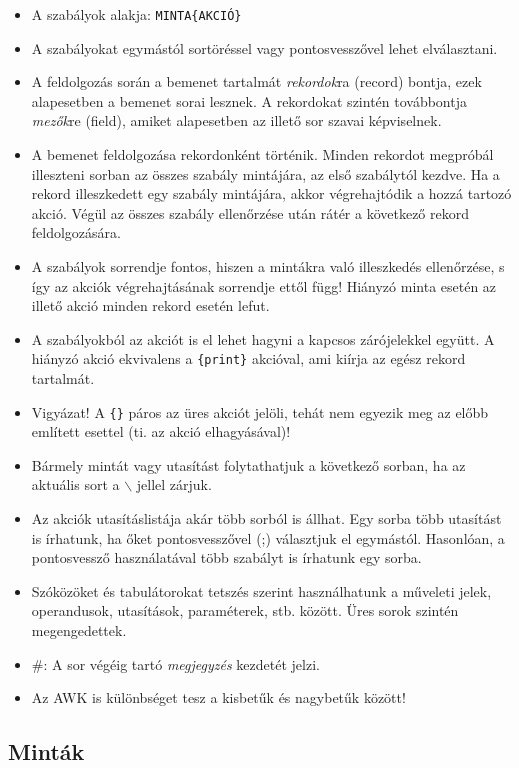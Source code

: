 \begin{itemize}
\item A szabályok alakja: \verb.MINTA{AKCIÓ}.
\item A szabályokat egymástól sortöréssel vagy pontosvesszővel lehet elválasztani.
\item A feldolgozás során a bemenet tartalmát \emph{rekordok}ra (record) bontja, ezek
alapesetben a bemenet sorai lesznek. A rekordokat szintén továbbontja \emph{mezők}re
(field), amiket alapesetben az illető sor szavai képviselnek.
\item A bemenet feldolgozása rekordonként történik. Minden rekordot megpróbál
illeszteni sorban az összes szabály mintájára, az első szabálytól kezdve. Ha a
rekord illeszkedett egy szabály mintájára, akkor végrehajtódik a hozzá tartozó
akció. Végül az összes szabály ellenőrzése után rátér a következő rekord feldolgozására.
\item A szabályok sorrendje fontos, hiszen a mintákra való illeszkedés ellenőrzése, s
így az akciók végrehajtásának sorrendje ettől függ!
Hiányzó minta esetén az illető akció minden rekord esetén lefut.
\item A szabályokból az akciót is el lehet hagyni a kapcsos zárójelekkel együtt. A
hiányzó akció ekvivalens a \verb.{print}. akcióval, ami kiírja az egész rekord tartalmát.
\item Vigyázat! A \verb.{}. páros az üres akciót jelöli, tehát nem egyezik meg az előbb
említett esettel (ti. az akció elhagyásával)!
\item Bármely mintát vagy utasítást folytathatjuk a következő sorban, ha az
aktuális sort a $\backslash$ jellel zárjuk.
\item Az akciók utasításlistája akár több sorból is állhat. Egy sorba több utasítást
is írhatunk, ha őket pontosvesszővel (;) választjuk el egymástól. Hasonlóan,
a pontosvessző használatával több szabályt is írhatunk egy sorba.
\item Szóközöket és tabulátorokat tetszés szerint használhatunk a műveleti jelek,
operandusok, utasítások, paraméterek, stb. között. Üres sorok szintén megengedettek.
\item \#: A sor végéig tartó \emph{megjegyzés} kezdetét jelzi.
\item Az AWK is különbséget tesz a kisbetűk és nagybetűk között!
\end{itemize}



\subsection{Minták}

